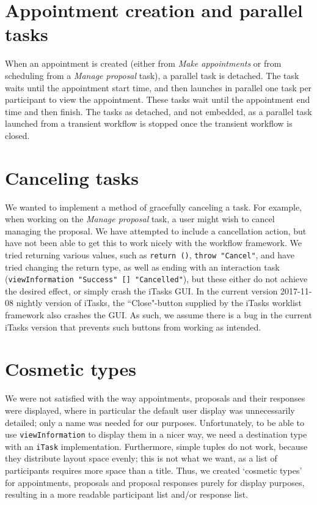 \documentclass{article}
\begin{document}
    \section{Appointment creation and parallel tasks}
	When an appointment is created (either from \emph{Make appointments} or from scheduling from a \emph{Manage proposal} task), a parallel task is detached.
	The task waits until the appointment start time, and then launches in parallel one task per participant to view the appointment.
	These tasks wait until the appointment end time and then finish.
	The tasks as detached, and not embedded, as a parallel task launched from a transient workflow is stopped once the transient workflow is closed.
    
    \section{Canceling tasks}
	We wanted to implement a method of gracefully canceling a task.
	For example, when working on the \emph{Manage proposal} task, a user might wish to cancel managing the proposal.
	We have attempted to include a cancellation action, but have not been able to get this to work nicely with the workflow framework.
	We tried returning various values, such as \lstinline|return ()|, \lstinline|throw "Cancel"|, and have tried changing the return type, as well as ending with an interaction task (\lstinline|viewInformation "Success" [] "Cancelled"|), but these either do not achieve the desired effect, or simply crash the iTasks GUI.
	In the current version 2017-11-08 nightly version of iTasks, the ``Close"-button supplied by the iTasks worklist framework also crashes the GUI.
	As such, we assume there is a bug in the current iTasks version that prevents such buttons from working as intended.
    
    \section{Cosmetic types}
	We were not satisfied with the way appointments, proposals and their responses were displayed, where in particular the default user display was unnecessarily detailed; only a name was needed for our purposes.
    Unfortunately, to be able to use \lstinline|viewInformation| to display them in a nicer way, we need a destination type with an \lstinline|iTask| implementation.
    Furthermore, simple tuples do not work, because they distribute layout space evenly; this is not what we want, as a list of participants requires more space than a title.
    Thus, we created `cosmetic types' for appointments, proposals and proposal responses purely for display purposes, resulting in a more readable participant list and/or response list.
	
\end{document}
